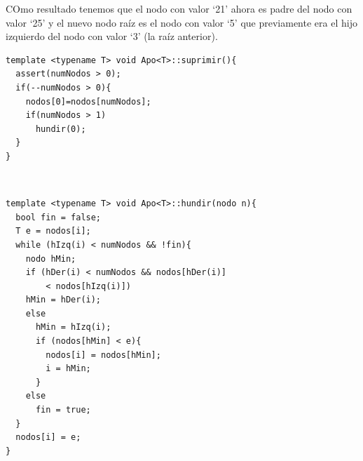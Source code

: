 COmo resultado tenemos que el nodo con valor `21' ahora es padre del nodo con valor `25' y el nuevo nodo raíz es el nodo con valor `5' que previamente era el hijo izquierdo del nodo con valor `3' (la raíz anterior).

\begin{verbatim}
template <typename T> void Apo<T>::suprimir(){
  assert(numNodos > 0);
  if(--numNodos > 0){
    nodos[0]=nodos[numNodos];
    if(numNodos > 1)
      hundir(0);
  }
}
\end{verbatim}
\\
\begin{verbatim}
template <typename T> void Apo<T>::hundir(nodo n){
  bool fin = false;
  T e = nodos[i];
  while (hIzq(i) < numNodos && !fin){
    nodo hMin;
    if (hDer(i) < numNodos && nodos[hDer(i)] 
        < nodos[hIzq(i)])
    hMin = hDer(i);
    else
      hMin = hIzq(i);
      if (nodos[hMin] < e){
        nodos[i] = nodos[hMin];
        i = hMin;
      }
    else
      fin = true;
  }
  nodos[i] = e;
}
\end{verbatim}